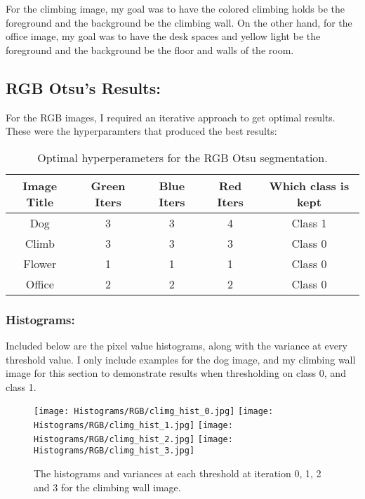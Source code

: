 \documentclass{article}
\begin{document}
For the climbing image, my goal was to have the colored climbing holds be the foreground and the background be the climbing wall. 
On the other hand, for the office image, my goal was to have the desk spaces and yellow light be the foreground and the background be the floor and walls of the room.

\subsection{RGB Otsu's Results:}
For the RGB images, I required an iterative approach to get optimal results. These were the hyperparamters that produced the best results:

\begin{table}[H]
    \centering
    \begin{tabular}{|c|c|c|c|c|}
        \hline
        \textbf{Image Title} & \textbf{Green Iters} & \textbf{Blue Iters} & \textbf{Red Iters} & \textbf{Which class is kept} \\
        \hline
        Dog & 3 & 3 & 4 & Class 1 \\
        \hline
        Climb & 3 & 3 & 3 & Class 0 \\
        \hline
        Flower & 1 & 1 & 1 & Class 0 \\
        \hline
        Office & 2 & 2 & 2 & Class 0 \\
        \hline
    \end{tabular}
    \caption{Optimal hyperperameters for the RGB Otsu segmentation.}
    \label{tab:RGB-hyperparamters}
\end{table}

\subsubsection{Histograms:}
Included below are the pixel value histograms, along with the variance at every threshold value. I only include examples 
for the dog image, and my climbing wall image for this section to demonstrate results when thresholding on class 0, and class 1.

\begin{figure}[H]
    \centering
    \texttt{[image: Histograms/RGB/climg\_hist\_0.jpg]}
    \texttt{[image: Histograms/RGB/climg\_hist\_1.jpg]}
    \texttt{[image: Histograms/RGB/climg\_hist\_2.jpg]}
    \texttt{[image: Histograms/RGB/climg\_hist\_3.jpg]}
    \caption{The histograms and variances at each threshold at iteration 0, 1, 2 and 3 for the climbing wall image.}
\end{figure}
\end{document}
